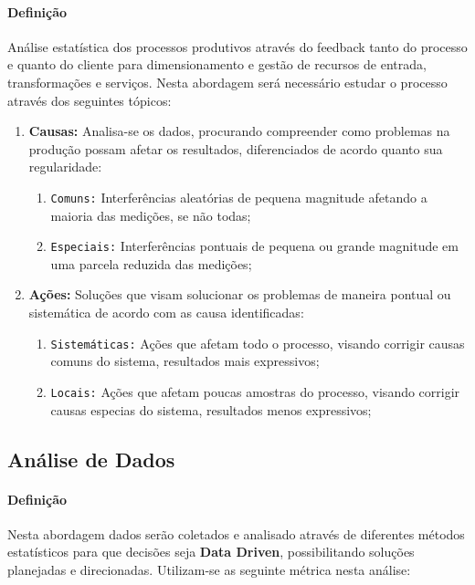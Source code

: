\documentclass{article}
\begin{document}
        \paragraph{Definição}Análise estatística dos processos produtivos através do feedback tanto do processo e quanto do cliente para dimensionamento e gestão de recursos de entrada, transformações e serviços. Nesta abordagem será necessário estudar o processo através dos seguintes tópicos:
            \begin{enumerate}[rightmargin = \leftmargin, noitemsep]
                \item \textbf{Causas:} Analisa-se os dados, procurando compreender como problemas na produção possam afetar os resultados, diferenciados de acordo quanto sua regularidade:
                    \begin{enumerate}[rightmargin = \leftmargin, noitemsep]
                        \item \texttt{Comuns:} Interferências aleatórias de pequena magnitude afetando a maioria das medições, se não todas;
                        \item \texttt{Especiais:} Interferências pontuais de pequena ou grande magnitude em uma parcela reduzida das medições;
                    \end{enumerate}
                \item \textbf{Ações:} Soluções que visam solucionar os problemas de maneira pontual ou sistemática de acordo com as causa identificadas:
                    \begin{enumerate}[rightmargin = \leftmargin, noitemsep]
                        \item \texttt{Sistemáticas:} Ações que afetam todo o processo, visando corrigir causas comuns do sistema, resultados mais expressivos;
                        \item \texttt{Locais:} Ações que afetam poucas amostras do processo, visando corrigir causas especias do sistema, resultados menos expressivos;
                    \end{enumerate}
            \end{enumerate}

        \subsection{Análise de Dados}
            \paragraph{Definição}Nesta abordagem dados serão coletados e analisado através de diferentes métodos estatísticos para que decisões seja \textbf{Data Driven}, possibilitando soluções planejadas e direcionadas. Utilizam-se as seguinte métrica nesta análise:
\end{document}
